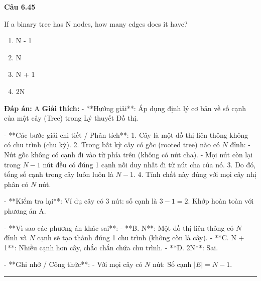 \documentclass[11pt,a4paper]{article}
\newenvironment{question}[1]{%
  \par\vspace{1em}\noindent\textbf{\large Câu #1}\par\vspace{0.4em}
}{%
  \par\vspace{1em}\hrule\vspace{0.6em}
}
\newenvironment{choices}{%
  \begin{enumerate}[label=\textbf{\Alph*.},leftmargin=2.2em,itemsep=2pt,topsep=3pt]
}{%
  \end{enumerate}
}
\newcommand{\choice}{\item}
\begin{document}
\begin{question}{6.45}
If a binary tree has N nodes, how many edges does it have?
\begin{choices}
\choice N - 1
\choice N
\choice N + 1
\choice 2N
\end{choices}
\textbf{Đáp án:} A
\textbf{Giải thích:} - **Hướng giải**:
  Áp dụng định lý cơ bản về số cạnh của một cây (Tree) trong Lý thuyết Đồ thị.

- **Các bước giải chi tiết / Phân tích**:
  1. Cây là một đồ thị liên thông không có chu trình (chu kỳ).
  2. Trong bất kỳ cây có gốc (rooted tree) nào có \(N\) đỉnh:
     - Nút gốc không có cạnh đi vào từ phía trên (không có nút cha).
     - Mọi nút còn lại trong \(N - 1\) nút đều có đúng 1 cạnh nối duy nhất đi từ nút cha của nó.
  3. Do đó, tổng số cạnh trong cây luôn luôn là \(N - 1\).
  4. Tính chất này đúng với mọi cây nhị phân có \(N\) nút.

- **Kiểm tra lại**:
  Ví dụ cây có 3 nút: số cạnh là \(3 - 1 = 2\). Khớp hoàn toàn với phương án A.

- **Vì sao các phương án khác sai**:
  - **B. N**: Một đồ thị liên thông có \(N\) đỉnh và \(N\) cạnh sẽ tạo thành đúng 1 chu trình (không còn là cây).
  - **C. N + 1**: Nhiều cạnh hơn cây, chắc chắn chứa chu trình.
  - **D. 2N**: Sai.

- **Ghi nhớ / Công thức**:
  - Với mọi cây có \(N\) nút: Số cạnh \(|E| = N - 1\).
\end{question}
\end{document}
